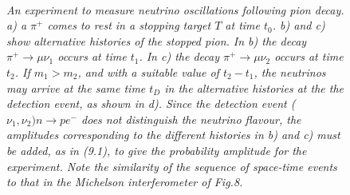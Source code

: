 {\begin{figure}[htbp]
\begin{center}
\hspace*{-0.5cm}\mbox{
}
\caption{{\sl An experiment to measure neutrino oscillations
  following pion decay. a) a $\pi^+$ comes to rest in a stopping target $T$ at time
  $t_0$.  b) and c) show alternative histories of the stopped pion. In b) the decay $\pi^+ \rightarrow
  \mu \nu_1$ occurs at time $t_1$. In c) the decay $\pi^+ \rightarrow
  \mu \nu_2$ occurs at time $t_2$. If $m_1 > m_2$, and with a suitable value of $t_2-t_1$, the 
    neutrinos may arrive at the same time $t_D$ in the alternative histories
  at the the detection event, as shown in d). Since the detection event ($\nu_1,\nu_2)n \rightarrow p e^-$
  does not distinguish the neutrino flavour, the amplitudes corresponding to the different histories
  in b) and c) must be added, as in (9.1), to give the probability amplitude for the experiment. 
  Note the similarity of the sequence of space-time events to that in the Michelson interferometer of
  Fig.8. }} 
\label{fig-fig11}
\end{center}
\end{figure}

}
